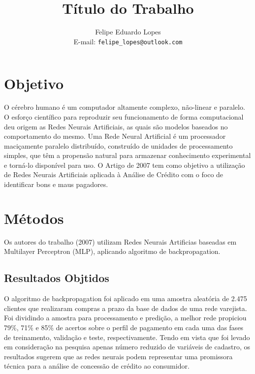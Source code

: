 \documentclass[a4paper,11pt]{article}
\title{Título do Trabalho}
\author{Felipe Eduardo Lopes\\E-mail: {\tt felipe\_lopes@outlook.com}}
\date{}
\begin{document}
\maketitle

\begin{multicols}{2}

\section{Objetivo}
O cérebro humano é um computador altamente complexo, não-linear e paralelo. O esforço científico para reproduzir seu funcionamento de forma computacional deu origem as Redes Neurais Artificiais, as quais são modelos baseados no comportamento do mesmo. Uma Rede Neural Artificial é um processador maciçamente paralelo distribuído, construído de unidades de processamento simples, que têm a propensão natural para armazenar conhecimento experimental e torná-lo disponível para uso. \cite{ref:haykin1}
O Artigo de 2007 \cite{ref:art2007} tem como objetivo a utilização de Redes Neurais Artificiais aplicada à Análise de Crédito com o foco de identificar bons e maus pagadores.


\section{Métodos}
Os autores do trabalho (2007)\cite{ref:art2007} utilizam Redes Neurais Artificias baseadas em Multilayer Perceptron (MLP), aplicando algoritmo de backpropagation.

\subsection{Resultados Objtidos}
O algoritmo de backpropagation foi aplicado em uma amostra aleatória de 2.475 clientes que realizaram compras a prazo
da base de dados de uma rede varejista. Foi dividindo a amostra para processamento e predição, a melhor rede propiciou 79\%, 71\% e 85\% de acertos sobre o perfil de pagamento em cada uma das
fases de treinamento, validação e teste,  respectivamente. Tendo em vista que foi levado em consideração na pesquisa apenas número reduzido de variáveis de cadastro, os resultados sugerem que as redes neurais podem representar uma promissora técnica para a análise de concessão de crédito ao consumidor.




\end{multicols}
\end{document}
